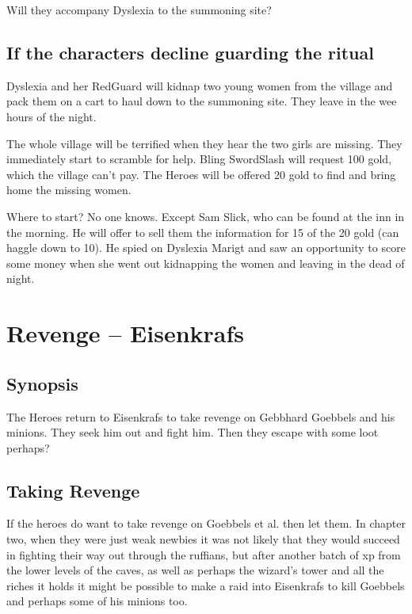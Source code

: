 Will they accompany Dyslexia to the summoning site?


\subsection*{If the characters decline guarding the ritual}
Dyslexia and her RedGuard will kidnap two young women from the village and pack them on a cart to haul down to the summoning site. They leave in the wee hours of the night.

The whole village will be terrified when they hear the two girls are missing. They immediately start to scramble for help. Bling SwordSlash will request 100 gold, which the village can't pay. The Heroes will be offered 20 gold to find and bring home the missing women.

Where to start? No one knows. Except Sam Slick, who can be found at the inn in the morning. He will offer to sell them the information for 15 of the 20 gold (can haggle down to 10). He spied on Dyslexia Marigt and saw an opportunity to score some money when she went out kidnapping the women and leaving in the dead of night.











\clearpage
{}
\section*{Revenge -- Eisenkrafs}


\subsection*{Synopsis}
The Heroes return to Eisenkrafs to take revenge on Gebbhard Goebbels and his minions. They seek him out and fight him. Then they escape with some loot perhaps?


\subsection*{Taking Revenge}
If the heroes do want to take revenge on Goebbels et al. then let them. In chapter two, when they were just weak newbies it was not likely that they would succeed in fighting their way out through the ruffians, but after another batch of xp from the lower levels of the caves, as well as perhaps the wizard's tower and all the riches it holds it might be possible to make a raid into Eisenkrafs to kill Goebbels and perhaps some of his minions too.

